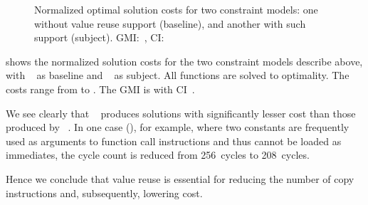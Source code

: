 

\begin{figure}
  \centering%
  \maxsizebox{\textwidth}{!}{%
    \trimBarchartPlot{%
    }%
  }

  \caption[Plot for evaluating value reuse's impact on code quality]%
          {%
            Normalized optimal solution costs for two constraint models: one
            without value reuse support (baseline), and another with such
            support (subject).
            GMI:~\printGMI{%
              \AltValuesVsWithoutCyclesSpeedupCyclesRegularSpeedupGmean%
            },
            CI:~\printGMICI{%
              \AltValuesVsWithoutCyclesSpeedupCyclesRegularSpeedupCiMin%
            }{%
              \AltValuesVsWithoutCyclesSpeedupCyclesRegularSpeedupCiMax%
            }%
          }
\end{figure}

 shows the normalized
\gls{solution} costs for the two \glspl{constraint model} describe above, with
~ as \gls{baseline} and
~ as \gls{subject}.
%
All \glspl{function} are solved to optimality.
%
The costs range from
\printMinCycles{%
  \AltValuesVsWithoutCyclesSpeedupCyclesAvgMin,
  \AltValuesVsWithoutCyclesSpeedupBaselineCyclesAvgMin
} to
\printMaxCycles{%
  \AltValuesVsWithoutCyclesSpeedupCyclesAvgMax,
  \AltValuesVsWithoutCyclesSpeedupBaselineCyclesAvgMax
}.
%
The \gls{GMI} is \printGMI{%
  \AltValuesVsWithoutCyclesSpeedupCyclesRegularSpeedupGmean%
} with \gls{CI}~\printGMICI{%
  \AltValuesVsWithoutCyclesSpeedupCyclesRegularSpeedupCiMin%
}{%
  \AltValuesVsWithoutCyclesSpeedupCyclesRegularSpeedupCiMax%
}.

We see clearly that ~
produces \glspl{solution} with significantly lesser cost than those produced by
~.
%
In one case (), for example, where two constants are
frequently used as arguments to \gls{function} call \glspl{instruction} and thus
cannot be loaded as immediates, the cycle count is reduced from \num{256}~cycles
to \num{208}~cycles.

Hence we conclude that \gls{value reuse} is essential for reducing the number of
copy \glspl{instruction} and, subsequently, lowering cost.


